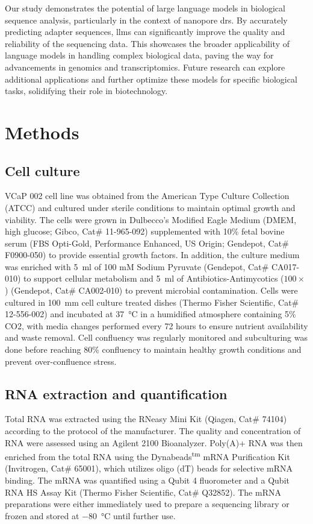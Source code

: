 \documentclass[pdflatex, sn-mathphys-num, lineno]{sn-jnl}%
\theoremstyle{thmstyleone}%
\theoremstyle{thmstyletwo}%
\theoremstyle{thmstylethree}%
\begin{document}
Our study demonstrates the potential of large language models in biological sequence analysis, particularly in the context of nanopore \gls{drs}.
By accurately predicting adapter sequences, \glspl{llm} can significantly improve the quality and reliability of the sequencing data.
This showcases the broader applicability of language models in handling complex biological data, paving the way for advancements in genomics and transcriptomics.
Future research can explore additional applications and further optimize these models for specific biological tasks, solidifying their role in biotechnology.


\section{Methods}\label{sec:methods}

\subsection{Cell culture}

VCaP 002 cell line was obtained from the American Type Culture Collection (ATCC) and cultured under sterile conditions to maintain optimal growth and viability.
The cells were grown in Dulbecco's Modified Eagle Medium (DMEM, high glucose; Gibco, Cat\# 11-965-092) supplemented with 10\% fetal bovine serum (FBS Opti-Gold, Performance Enhanced, US Origin; Gendepot, Cat\# F0900-050) to provide essential growth factors.
In addition, the culture medium was enriched with \SI{5}{\ml} of 100 mM Sodium Pyruvate (Gendepot, Cat\# CA017-010) to support cellular metabolism and \SI{5}{\ml} of Antibiotics-Antimycotics (\( 100\times \)) (Gendepot, Cat\# CA002-010) to prevent microbial contamination.
Cells were cultured in \SI{100}{\mm} cell culture treated dishes (Thermo Fisher Scientific, Cat\# 12-556-002) and incubated at \SI{37}{\degreeCelsius} in a humidified atmosphere containing 5\% CO2, with media changes performed every 72 hours to ensure nutrient availability and waste removal.
Cell confluency was regularly monitored and subculturing was done before reaching 80\% confluency to maintain healthy growth conditions and prevent over-confluence stress.

\subsection{RNA extraction and quantification}

Total RNA was extracted using the RNeasy Mini Kit (Qiagen, Cat\# 74104) according to the protocol of the manufacturer.
The quality and concentration of RNA were assessed using an Agilent 2100 Bioanalyzer.
Poly(A)+ RNA was then enriched from the total RNA using the Dynabeads\textsuperscript{tm} mRNA Purification Kit (Invitrogen, Cat\# 65001), which utilizes oligo (dT) beads for selective mRNA binding.
The mRNA was quantified using a Qubit 4 fluorometer and a Qubit RNA HS Assay Kit (Thermo Fisher Scientific, Cat\# Q32852).
The mRNA preparations were either immediately used to prepare a sequencing library or frozen and stored at \SI{-80}{\degreeCelsius} until further use.
\end{document}
